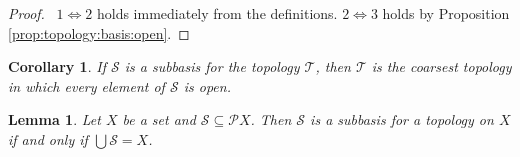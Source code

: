 \documentclass{report}
\let\qed\relax
\newtheorem{lm}{Lemma}[section]
\newtheorem{cor}{Corollary}[lm]
\theoremstyle{definition}
\begin{document}
  \begin{proof}
    \pf\ $1 \Leftrightarrow 2$ holds immediately from the definitions. $2
    \Leftrightarrow 3$ holds by Proposition \ref{prop:topology:basis:open}. \qed
  \end{proof}

  \begin{cor}
    \label{cor:topology:subbasis:coarsest}
    If $\mathcal{S}$ is a subbasis for the topology $\mathcal{T}$, then
    $\mathcal{T}$ is the coarsest topology in which every element of
    $\mathcal{S}$ is open.
  \end{cor}

  \begin{lm}
    Let $X$ be a set and $\mathcal{S} \subseteq \mathcal{P} X$. Then
    $\mathcal{S}$ is a subbasis for a topology on $X$ if and only if $\bigcup
    \mathcal{S} = X$.
  \end{lm}
\end{document}
